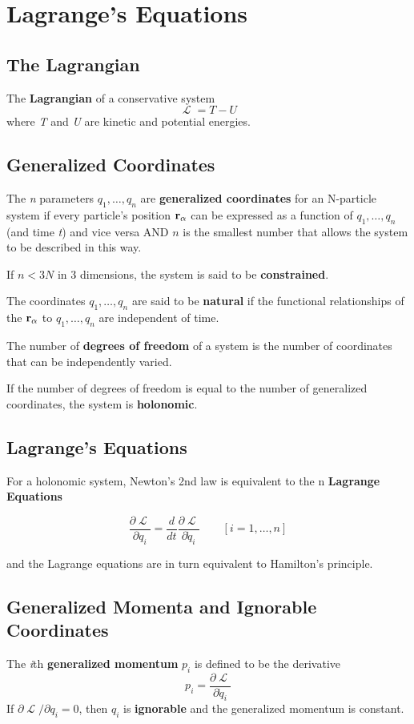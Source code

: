 \documentclass{article}
\DeclareMathOperator{\Lagr}{\mathcal{L}}
\begin{document}
\section{Lagrange's Equations}
\subsection{The Lagrangian}
The \textbf{Lagrangian} \Lagr of a conservative system 
$$ \Lagr = T - U $$
where \textit{T} and \textit{U} are kinetic and potential energies.

\subsection{Generalized Coordinates}
The \textit{n} parameters $q_1, \dots, q_n$ are \textbf{generalized coordinates} for an N-particle system if every particle's position $\vb{r}_\alpha$ can be expressed as a function of $q_1, \dots, q_n$ (and time \textit{t}) and vice versa AND $n$ is the smallest number that allows the system to be described in this way.

If $n  < 3N$ in 3 dimensions, the system is said to be \textbf{constrained}.

The coordinates $q_1, \dots, q_n$ are said to be \textbf{natural} if the functional relationships of the $\vb{r}_\alpha$ to $q_1, \dots, q_n$ are independent of time.

The number of \textbf{degrees of freedom} of a system is the number of coordinates that can be independently varied.

If the number of degrees of freedom is equal to the number of generalized coordinates, the system is \textbf{holonomic}.

\subsection{Lagrange's Equations}
For a holonomic system, Newton's 2nd law is equivalent to the n \textbf{Lagrange Equations}

$$
\frac{\partial \Lagr}{\partial q_i} = \frac{d}{dt}\frac{\partial \Lagr}{\partial \dot q_i} \qquad [i = 1,\dots,n]
$$

and the Lagrange equations are in turn equivalent to Hamilton's principle.

\subsection{Generalized Momenta and Ignorable Coordinates}
The \textit{i}th \textbf{generalized momentum} $p_i$ is defined to be the derivative
$$
p_i = \frac{\partial \Lagr}{\partial \dot q_i}
$$
If $\partial \Lagr / \partial q_i = 0$, then $q_i$ is \textbf{ignorable} and the generalized momentum is constant.
\end{document}
